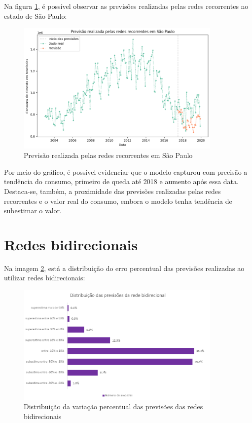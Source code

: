 Na figura \ref{img:consumo-sp-rnn}, é possível observar as previsões realizadas pelas 
redes recorrentes no estado de São Paulo:

\begin{figure}[H]
    \centering
    \includegraphics[width=10cm]{../figuras/graficos/rnn/prev_sp.png}
    \caption{Previsão realizada pelas redes recorrentes em São Paulo}
    \label{img:consumo-sp-rnn}
\end{figure}

Por meio do gráfico, é possível evidenciar que o modelo capturou com precisão a tendência do 
consumo, primeiro de queda até 2018 e aumento após essa data. Destaca-se, 
também, a proximidade das previsões realizadas pelas redes recorrentes e o 
valor real do consumo, embora o modelo tenha tendência de subestimar o valor.


\section{Redes bidirecionais}

Na imagem \ref{img:erro-perc-bnn}, está a distribuição do erro percentual das 
previsões realizadas ao utilizar redes bidirecionais:

\begin{figure}[H] 
    \centering
    \includegraphics[width=10cm]{../figuras/graficos/bi/erro-perc-bi.png}
    \caption{Distribuição da variação percentual das previsões das redes bidirecionais}
    \label{img:erro-perc-bnn}
\end{figure}

